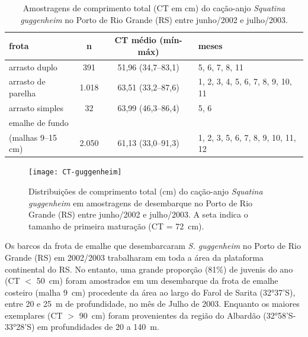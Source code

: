 \documentclass[a4paper,11pt,twoside,showtrims,onecolumn,openright,final]{memoir}
\begin{document}
\begin{table}
\caption[Amostragens de comprimento total do cação-anjo \emph{Squatina guggenheim}]
        {Amostragens de comprimento total (CT em cm) do cação-anjo \emph{Squatina guggenheim} no 
         Porto de Rio Grande (RS) entre junho/2002 e julho/2003.}
\label{tab:ct-gugenheim}
\begin{center}
\begin{tabular*}{\textwidth}{l@{\extracolsep{\fill}}ccl}
\toprule
frota			& n		& CT médio (mín-máx)		& meses					\\
\midrule
arrasto duplo		& 391		& 51,96 (34,7--83,1)		& 5, 6, 7, 8, 11			\\
arrasto de parelha	& 1.018		& 63,51 (33,2--87,6)		& 1, 2, 3, 4, 5, 6, 7, 8, 9, 10, 11	\\
arrasto simples		& 32		& 63,99 (46,3--86,4)		& 5, 6					\\
emalhe de fundo		&               &                               &					\\
(malhas 9--15 cm)	& 2.050		& 61,13 (33,0--91,3)		& 1, 2, 3, 5, 6, 7, 8, 9, 10, 11, 12	\\
\bottomrule
\end{tabular*}
\end{center}
\end{table}

%
%

\begin{figure}
\begin{center}
\texttt{[image: CT-guggenheim]}
\end{center}
\caption[Distribuições de comprimento total do cação-anjo \emph{Squatina guggenheim}.]
        {Distribuições de comprimento total (cm) do cação-anjo \emph{Squatina guggenheim} 
         em amostragens de desembarque no Porto de Rio Grande (RS) entre junho/2002 e julho/2003.
	 A seta indica o tamanho de primeira maturação (CT = 72~cm).}
\label{fig:ct-gugenheim}
\end{figure}


Os barcos da frota de emalhe que desembarcaram \emph{S. guggenheim} no Porto de Rio Grande (RS) 
em 2002/2003 trabalharam em toda a área da plataforma continental do RS. No entanto, 
uma grande proporção (81\%) de juvenis do ano (CT $<$ 50~cm) foram amostrados em um 
desembarque da frota de emalhe costeiro (malha 9~cm) procedente da área ao largo 
do Farol de Sarita (32°37'S), entre 20 e 25~m de profundidade, no mês de Julho de 2003. 
Enquanto os maiores exemplares (CT $>$ 90~cm) foram provenientes da região 
do Albardão (32°58'S-33°28'S) em profundidades de 20 a 140~m.
\end{document}
